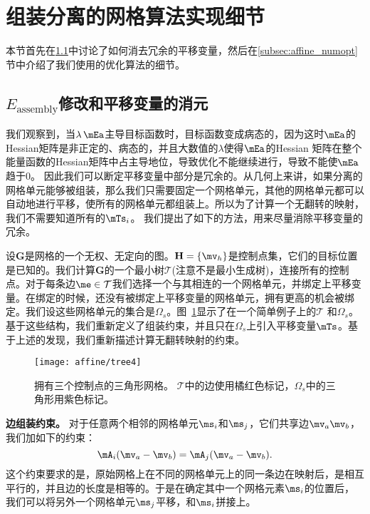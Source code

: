 \section{组装分离的网格算法实现细节} \label{sec:assembly}
本节首先在\ref{subsec:affine_vars}中讨论了如何消去冗余的平移变量，然后在\ref{subsec:affine_numopt}节中介绍了我们使用的优化算法的细节。

\subsection{$E_\textrm{assembly}$修改和平移变量的消元} \label{subsec:affine_vars}
我们观察到，当$\lambda\,\mEa$主导目标函数时，目标函数变成病态的，因为这时$\mEa$的Hessian矩阵是非正定的、病态的，并且大数值的$\lambda$使得$\mEa$的Hessian 矩阵在整个能量函数的Hessian矩阵中占主导地位，导致优化不能继续进行，导致不能使$\mEa$ 趋于0。 因此我们可以断定平移变量中部分是冗余的。从几何上来讲，如果分离的网格单元能够被组装，那么我们只需要固定一个网格单元，其他的网格单元都可以自动地进行平移，使所有的网格单元都组装上。所以为了计算一个无翻转的映射，我们不需要知道所有的$\mTs_i$。 我们提出了如下的方法，用来尽量消除平移变量的冗余。

设$\mathbf{G}$是网格的一个无权、无定向的图。$\mathbf{H} = \{\mv_h\}$是控制点集，它们的目标位置是已知的。我们计算$\mathbf{G}$的一个最小树$\mathcal{T}$(注意不是最小生成树)，连接所有的控制点。对于每条边$\me \in \mathcal{T}$我们选择一个与其相连的一个网格单元，并绑定上平移变量。在绑定的时候，还没有被绑定上平移变量的网格单元，拥有更高的机会被绑定。我们设这些网格单元的集合是$\Omega_s$。图~\ref{fig:reduction_graph}显示了在一个简单例子上的$\mathcal{T}$ 和$\Omega_s$。基于这些结构，我们重新定义了组装约束，并且只在$\Omega_s$上引入平移变量$\mTs$。基于上述的发现，我们重新描述计算无翻转映射的约束。

\begin{figure}[t]
  \centering
  \texttt{[image: affine/tree4]}
  \caption{拥有三个控制点的三角形网格。 $\mathcal{T}$中的边使用橘红色标记，$\Omega_s$中的三角形用紫色标记。}
  \label{fig:reduction_graph}
  \vspace{-5mm}
\end{figure}

\textbf{边组装约束。}  对于任意两个相邻的网格单元$\ms_i$和$\ms_j$，它们共享边$\mv_a\mv_b$，我们加如下的约束：
\begin{equation} \label{eqn:edge_assmebly}
 \mA_i (\mv_a-\mv_b) = \mA_j (\mv_a-\mv_b).
\end{equation}
这个约束要求的是，原始网格上在不同的网格单元上的同一条边在映射后，是相互平行的，并且边的长度是相等的。于是在确定其中一个网格元素$\ms_i$的位置后，我们可以将另外一个网格单元$\ms_j$平移，和$\ms_i$拼接上。

